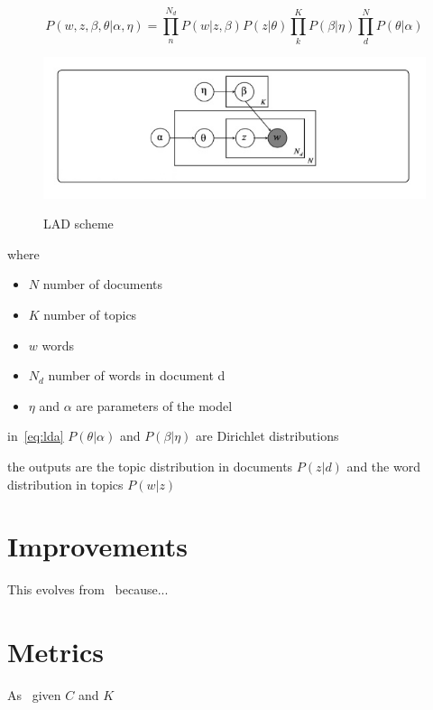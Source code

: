 \begin{equation}\label{eq:lda}
  P(w, z,\beta, \theta| \alpha, \eta)=\prod_n^{N_d} P(w|z,\beta)P(z|\theta)\prod_k^KP(\beta|\eta)\prod_d^N P(\theta | \alpha)
\end{equation}

\begin{figure}
  \centering
  \includegraphics[width=0.5\linewidth]{pictures/topic/LDA.jpeg}
  \label{fig:LDA}
  \caption{LAD scheme}
\end{figure}

where

\begin{itemize}
  \item $N$ number of documents
  \item $K$ number of topics
  \item $w$ words
  \item $N_d$ number of words in document d
  \item $\eta$ and $\alpha$ are parameters of the model
\end{itemize}

in~\ref{eq:lda} $P(\theta | \alpha)$ and $P(\beta|\eta)$ are Dirichlet distributions

the outputs are the topic distribution in documents $P(z|d)$ and the word distribution in topics $P(w|z)$

\section{Improvements}
This evolves from~\cite{Holland1983} because...


\section{Metrics}
As~\cite{rosenberg2007v} given $C$ and $K$
